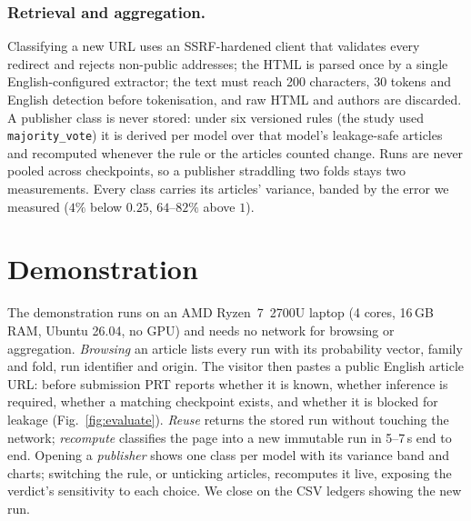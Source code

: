 \documentclass[runningheads]{llncs}
\newif\ifprovisionaldraft
\newcommand{\provisional}[1]{\ifprovisionaldraft\textcolor{provisional}{#1}\else#1\fi}
\newcommand{\editornote}[1]{\ifprovisionaldraft
  \marginpar{\raggedright\textcolor{provisional}{%
    \textsf{\scriptsize\textbf{Editor:} #1}}}\fi}
\begin{document}
\subsubsection{Retrieval and aggregation.}
Classifying a new URL uses an SSRF-hardened client that validates every
redirect and rejects non-public addresses; the HTML is parsed once by a single
English-configured extractor; the text must reach 200 characters, 30 tokens and
English detection before tokenisation, and raw HTML and authors are discarded. A publisher class is never stored: under six
versioned rules (the study used \texttt{majority\_vote}) it is derived per model
over that model's leakage-safe articles and recomputed whenever the rule or the
articles counted change. Runs are never pooled across checkpoints, so a
publisher straddling two folds stays two measurements.
\provisional{Every class carries its articles' variance, banded by the error we
measured ($4\%$ below $0.25$, $64$--$82\%$ above $1$).}
\editornote{side analysis; undecided for the final paper.}

\section{Demonstration}
\label{sec:demo}

The demonstration runs on an AMD Ryzen~7~2700U laptop (4 cores, 16\,GB RAM,
Ubuntu 26.04, no GPU) and needs no network for browsing or aggregation.
\emph{Browsing} an article lists every run with its probability vector, family
and fold, run identifier and origin. The visitor then pastes a public English
article URL: before submission PRT reports whether it is known, whether
inference is required, whether a matching checkpoint exists, and whether it is
blocked for leakage (Fig.~\ref{fig:evaluate}). \emph{Reuse} returns the stored run without touching
the network; \emph{recompute} classifies the page into a new immutable run in
5--7\,s end to end. Opening a \emph{publisher} shows one class per model
with \provisional{its variance band and} charts; switching the rule, or
unticking articles, recomputes it live, exposing the verdict's sensitivity to
each choice. We close
on the CSV ledgers showing the new run.
\end{document}
